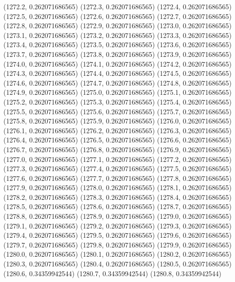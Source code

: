 {					(1272.2, 0.262071686565)
					(1272.3, 0.262071686565)
					(1272.4, 0.262071686565)
					(1272.5, 0.262071686565)
					(1272.6, 0.262071686565)
					(1272.7, 0.262071686565)
					(1272.8, 0.262071686565)
					(1272.9, 0.262071686565)
					(1273.0, 0.262071686565)
					(1273.1, 0.262071686565)
					(1273.2, 0.262071686565)
					(1273.3, 0.262071686565)
					(1273.4, 0.262071686565)
					(1273.5, 0.262071686565)
					(1273.6, 0.262071686565)
					(1273.7, 0.262071686565)
					(1273.8, 0.262071686565)
					(1273.9, 0.262071686565)
					(1274.0, 0.262071686565)
					(1274.1, 0.262071686565)
					(1274.2, 0.262071686565)
					(1274.3, 0.262071686565)
					(1274.4, 0.262071686565)
					(1274.5, 0.262071686565)
					(1274.6, 0.262071686565)
					(1274.7, 0.262071686565)
					(1274.8, 0.262071686565)
					(1274.9, 0.262071686565)
					(1275.0, 0.262071686565)
					(1275.1, 0.262071686565)
					(1275.2, 0.262071686565)
					(1275.3, 0.262071686565)
					(1275.4, 0.262071686565)
					(1275.5, 0.262071686565)
					(1275.6, 0.262071686565)
					(1275.7, 0.262071686565)
					(1275.8, 0.262071686565)
					(1275.9, 0.262071686565)
					(1276.0, 0.262071686565)
					(1276.1, 0.262071686565)
					(1276.2, 0.262071686565)
					(1276.3, 0.262071686565)
					(1276.4, 0.262071686565)
					(1276.5, 0.262071686565)
					(1276.6, 0.262071686565)
					(1276.7, 0.262071686565)
					(1276.8, 0.262071686565)
					(1276.9, 0.262071686565)
					(1277.0, 0.262071686565)
					(1277.1, 0.262071686565)
					(1277.2, 0.262071686565)
					(1277.3, 0.262071686565)
					(1277.4, 0.262071686565)
					(1277.5, 0.262071686565)
					(1277.6, 0.262071686565)
					(1277.7, 0.262071686565)
					(1277.8, 0.262071686565)
					(1277.9, 0.262071686565)
					(1278.0, 0.262071686565)
					(1278.1, 0.262071686565)
					(1278.2, 0.262071686565)
					(1278.3, 0.262071686565)
					(1278.4, 0.262071686565)
					(1278.5, 0.262071686565)
					(1278.6, 0.262071686565)
					(1278.7, 0.262071686565)
					(1278.8, 0.262071686565)
					(1278.9, 0.262071686565)
					(1279.0, 0.262071686565)
					(1279.1, 0.262071686565)
					(1279.2, 0.262071686565)
					(1279.3, 0.262071686565)
					(1279.4, 0.262071686565)
					(1279.5, 0.262071686565)
					(1279.6, 0.262071686565)
					(1279.7, 0.262071686565)
					(1279.8, 0.262071686565)
					(1279.9, 0.262071686565)
					(1280.0, 0.262071686565)
					(1280.1, 0.262071686565)
					(1280.2, 0.262071686565)
					(1280.3, 0.262071686565)
					(1280.4, 0.262071686565)
					(1280.5, 0.262071686565)
					(1280.6, 0.34359942544)
					(1280.7, 0.34359942544)
					(1280.8, 0.34359942544)
}
